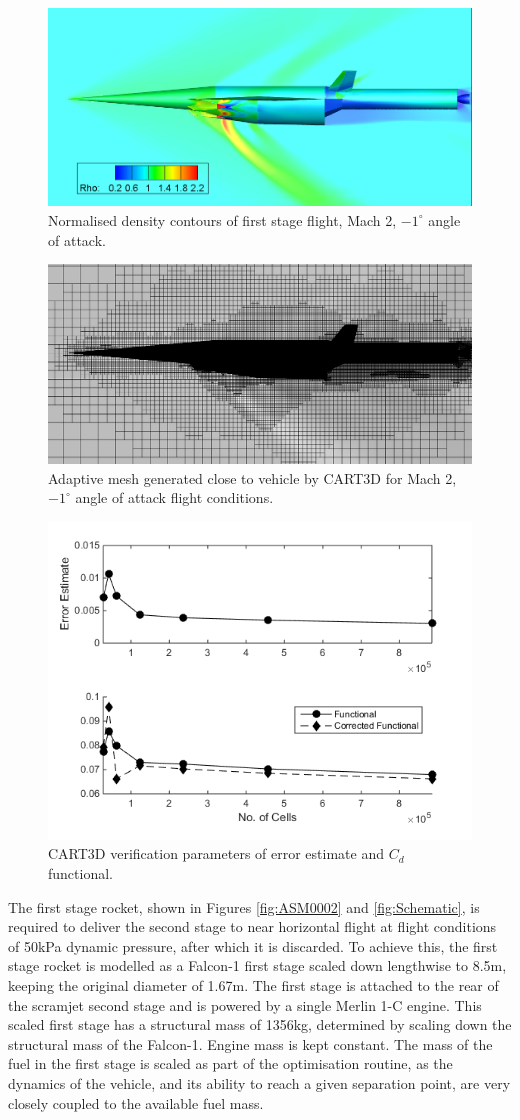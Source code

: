 \documentclass[]{aiaa-tc}
\begin{document}
\begin{figure}[ht]
	\centering
	\includegraphics[width=0.6\linewidth]{CARTcontour}
	\caption{Normalised density contours of first stage flight, Mach 2, $-1^\circ$ angle of attack.}
	\label{fig:CARTcontour}
\end{figure}
\begin{figure}[ht]
	\centering
	\includegraphics[width=0.6\linewidth]{CARTmesh}
	\caption{Adaptive mesh generated close to vehicle by CART3D for Mach 2, $-1^\circ$ angle of attack flight conditions.}
	\label{fig:CARTmesh}
\end{figure}
\begin{figure}[ht]
	\centering
	\includegraphics[width=0.4\linewidth]{CART}
	\caption{CART3D verification parameters of error estimate and $C_d$ functional.}
	\label{fig:CART}
\end{figure}

The first stage rocket, shown in Figures \ref{fig:ASM0002} and \ref{fig:Schematic}, is required to deliver the second stage to near horizontal flight at flight conditions of 50kPa dynamic pressure, after which it is discarded. To achieve this, the first stage rocket is modelled as a Falcon-1 first stage scaled down lengthwise to 8.5m, keeping the original diameter of 1.67m. The first stage is attached to the rear of the scramjet second stage and is powered by a single Merlin 1-C engine.  This scaled first stage has a structural mass of 1356kg, determined by scaling down the structural mass of the Falcon-1. Engine mass is kept constant. The mass of the fuel in the first stage is scaled as part of the optimisation routine, as the dynamics of the vehicle, and its ability to reach a given separation point, are very closely coupled to the available fuel mass. 
\end{document}
